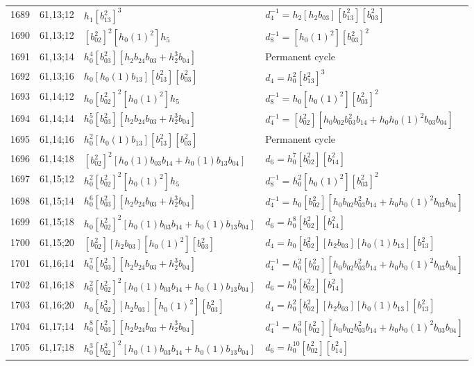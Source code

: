 \documentclass{article}
\begin{document}
\begin{longtable}{|l|l|>{\raggedright\arraybackslash}p{6cm}|>{\raggedright\arraybackslash}p{6cm}|}
\hline
1689 & 61,13;12 & $h_1[b_{13}^2]^3$ & $d_{4}^{-1}=h_2[h_2b_{03}][b_{13}^2][b_{03}^2]$\\
1690 & 61,13;12 & $[b_{02}^2]^2[h_0(1)^2]h_5$ & $d_{8}^{-1}=[h_0(1)^2][b_{03}^2]^2$\\
\hline
1691 & 61,13;14 & $h_0^4[b_{03}^2][h_2b_{24}b_{03} + h_2^3b_{04}]$ & Permanent cycle\\
\hline
1692 & 61,13;16 & $h_0[h_0(1)b_{13}][b_{13}^2][b_{03}^2]$ &$d_{4}=h_0^2[b_{13}^2]^3$\\
\hline
1693 & 61,14;12 & $h_0[b_{02}^2]^2[h_0(1)^2]h_5$ & $d_{8}^{-1}=h_0[h_0(1)^2][b_{03}^2]^2$\\
\hline
1694 & 61,14;14 & $h_0^5[b_{03}^2][h_2b_{24}b_{03} + h_2^3b_{04}]$ & $d_{4}^{-1}=[b_{02}^2][h_0b_{02}b_{03}^2b_{14} + h_0h_0(1)^2b_{03}b_{04}]$\\
\hline
1695 & 61,14;16 & $h_0^2[h_0(1)b_{13}][b_{13}^2][b_{03}^2]$ & Permanent cycle\\
\hline
1696 & 61,14;18 & $[b_{02}^2]^2[h_0(1)b_{03}b_{14} + h_0(1)b_{13}b_{04}]$ &$d_{6}=h_0^7[b_{02}^2][b_{14}^2]$\\
\hline
1697 & 61,15;12 & $h_0^2[b_{02}^2]^2[h_0(1)^2]h_5$ & $d_{8}^{-1}=h_0^2[h_0(1)^2][b_{03}^2]^2$\\
\hline
1698 & 61,15;14 & $h_0^6[b_{03}^2][h_2b_{24}b_{03} + h_2^3b_{04}]$ & $d_{4}^{-1}=h_0[b_{02}^2][h_0b_{02}b_{03}^2b_{14} + h_0h_0(1)^2b_{03}b_{04}]$\\
\hline
1699 & 61,15;18 & $h_0[b_{02}^2]^2[h_0(1)b_{03}b_{14} + h_0(1)b_{13}b_{04}]$ &$d_{6}=h_0^8[b_{02}^2][b_{14}^2]$\\
\hline
1700 & 61,15;20 & $[b_{02}^2][h_2b_{03}][h_0(1)^2][b_{03}^2]$ &$d_{4}=h_0[b_{02}^2][h_2b_{03}][h_0(1)b_{13}][b_{13}^2]$\\
\hline
1701 & 61,16;14 & $h_0^7[b_{03}^2][h_2b_{24}b_{03} + h_2^3b_{04}]$ & $d_{4}^{-1}=h_0^2[b_{02}^2][h_0b_{02}b_{03}^2b_{14} + h_0h_0(1)^2b_{03}b_{04}]$\\
\hline
1702 & 61,16;18 & $h_0^2[b_{02}^2]^2[h_0(1)b_{03}b_{14} + h_0(1)b_{13}b_{04}]$ &$d_{6}=h_0^9[b_{02}^2][b_{14}^2]$\\
\hline
1703 & 61,16;20 & $h_0[b_{02}^2][h_2b_{03}][h_0(1)^2][b_{03}^2]$ &$d_{4}=h_0^2[b_{02}^2][h_2b_{03}][h_0(1)b_{13}][b_{13}^2]$\\
\hline
1704 & 61,17;14 & $h_0^8[b_{03}^2][h_2b_{24}b_{03} + h_2^3b_{04}]$ & $d_{4}^{-1}=h_0^3[b_{02}^2][h_0b_{02}b_{03}^2b_{14} + h_0h_0(1)^2b_{03}b_{04}]$\\
\hline
1705 & 61,17;18 & $h_0^3[b_{02}^2]^2[h_0(1)b_{03}b_{14} + h_0(1)b_{13}b_{04}]$ &$d_{6}=h_0^{10}[b_{02}^2][b_{14}^2]$\\

\end{longtable}
\end{document}
